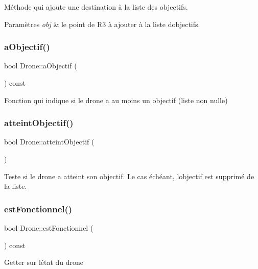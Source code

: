 Méthode qui ajoute une destination à la liste des objectifs. 
\begin{DoxyParams}{Paramètres}
{\em obj} & le point de R3 à ajouter à la liste d\textquotesingle{}objectifs. \\
\hline
\end{DoxyParams}
\mbox{\label{class_drone_a42c8991a71af54828612cba245b84063}} 
\subsubsection{\texorpdfstring{a\+Objectif()}{aObjectif()}}
{\footnotesize\ttfamily bool Drone\+::a\+Objectif (\begin{DoxyParamCaption}{ }\end{DoxyParamCaption}) const}

Fonction qui indique si le drone a au moins un objectif (liste non nulle) \mbox{\label{class_drone_a4e2e166a9a0c5732e789d08c6cda56d1}} 
\subsubsection{\texorpdfstring{atteint\+Objectif()}{atteintObjectif()}}
{\footnotesize\ttfamily bool Drone\+::atteint\+Objectif (\begin{DoxyParamCaption}{ }\end{DoxyParamCaption})}

Teste si le drone a atteint son objectif. Le cas échéant, l\textquotesingle{}objectif est supprimé de la liste. \mbox{\label{class_drone_a6df0c61c5aa61884d87365696f33affd}} 
\subsubsection{\texorpdfstring{est\+Fonctionnel()}{estFonctionnel()}}
{\footnotesize\ttfamily bool Drone\+::est\+Fonctionnel (\begin{DoxyParamCaption}{ }\end{DoxyParamCaption}) const}

Getter sur l\textquotesingle{}état du drone \mbox{\label{class_drone_a87ea8e6f37a123251b59ad936e51d4ad}} 
